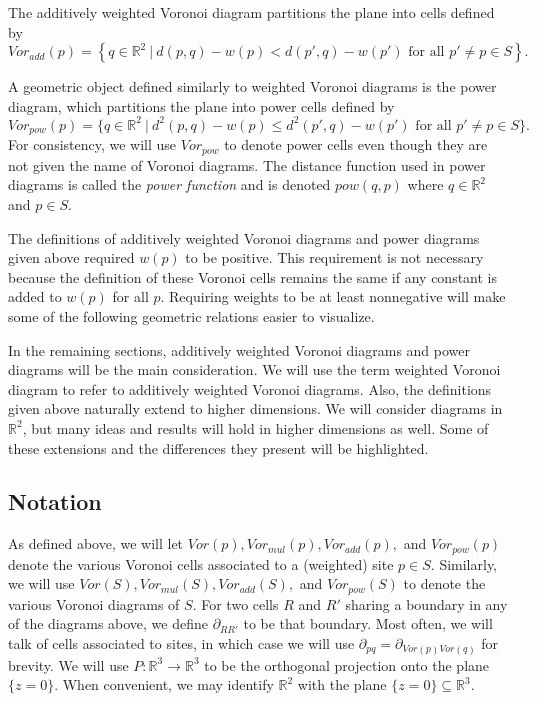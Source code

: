 \documentclass[a4paper, 11pt]{article}
\newcommand{\R}{\mathbb{R}}
\begin{document}
The additively weighted Voronoi diagram partitions the plane into cells defined by
\begin{equation*}
  Vor_{add}(p) = \left\{ q \in \R^2 \ | \ d(p,q) - w(p) < d(p',q) - w(p') \text{ for all } p' \neq p \in S \right\}.
\end{equation*}

A geometric object defined similarly to weighted Voronoi diagrams is the power diagram, which partitions the plane into power cells defined by
\begin{equation*}
  Vor_{pow}(p) = \{ q \in \R^2 \ | \ d^2(p,q) - w(p) \leq d^2(p',q) - w(p') \text{ for all } p' \neq p \in S \}.
\end{equation*}
For consistency, we will use $Vor_{pow}$ to denote power cells even though they are not given the name of Voronoi diagrams.
The distance function used in power diagrams is called the \textit{power function} and is denoted
$pow(q,p)$ where $q \in \R^2$ and $p \in S$.

The definitions of additively weighted Voronoi diagrams and power diagrams given above required $w(p)$ to be positive. This requirement is not
necessary because the definition of these Voronoi cells remains the same if any constant is added to $w(p)$ for all $p$. Requiring weights to be at
least nonnegative will make some of the following geometric relations easier to visualize.

In the remaining sections, additively weighted Voronoi diagrams and power diagrams will be the main consideration. We will use the term weighted
Voronoi diagram to refer to additively weighted Voronoi diagrams. Also, the definitions given above naturally extend to higher dimensions. We will
consider diagrams in $\R^2$, but many ideas and results will hold in higher dimensions as well. Some of these extensions and the differences they
present will be highlighted.

\subsection{Notation}

As defined above, we will let $Vor(p), Vor_{mul}(p), Vor_{add}(p),$ and $Vor_{pow}(p)$ denote the various Voronoi cells associated to a (weighted) site $p
\in S$. Similarly, we will use $Vor(S), Vor_{mul}(S), Vor_{add}(S),$ and $Vor_{pow}(S)$ to denote the various Voronoi diagrams of $S$. For two
cells $R$ and $R'$ sharing a boundary in any of the diagrams above, we define $\partial_{R R'}$ to be that boundary. Most often, we will talk of cells
associated to sites, in which case we will use $\partial_{pq} = \partial_{Vor(p) Vor(q)}$ for brevity. We will use $P: \R^3 \to \R^3$ to be the
orthogonal projection onto the plane $\{ z = 0 \}$. When convenient, we may identify $\R^2$ with the plane $\{ z=0 \} \subseteq \R^3$.
\end{document}
